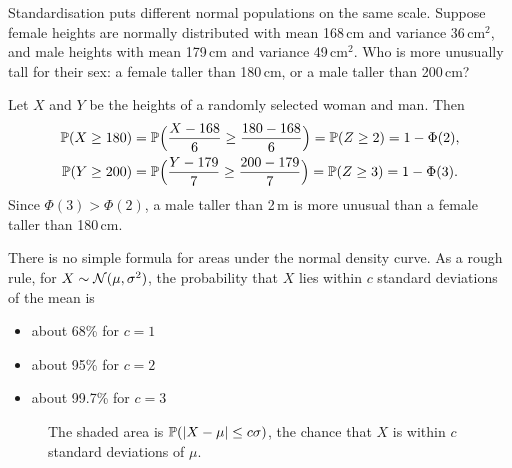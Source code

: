 \begin{example}\label{ex:standardisation-heights}
Standardisation puts different normal populations on the same scale. Suppose female heights are normally distributed with mean 168\,cm and variance 36\,cm$^2$, and male heights with mean 179\,cm and variance 49\,cm$^2$. Who is more unusually tall for their sex: a female taller than 180\,cm, or a male taller than 200\,cm?
\end{example}

\begin{solution}
Let $X$ and $Y$ be the heights of a randomly selected woman and man. Then
\begin{align*}
  \mathbb{P}(X \ge 180) &= \mathbb{P}\Bigl(\frac{X - 168}{6} \ge \frac{180 - 168}{6}\Bigr) = \mathbb{P}(Z \ge 2) = 1 - \Phi(2), \\
  \mathbb{P}(Y \ge 200) &= \mathbb{P}\Bigl(\frac{Y - 179}{7} \ge \frac{200 - 179}{7}\Bigr) = \mathbb{P}(Z \ge 3) = 1 - \Phi(3).
\end{align*}
Since $\Phi(3) > \Phi(2)$, a male taller than 2\,m is more unusual than a female taller than 180\,cm.
\end{solution}

There is no simple formula for areas under the normal density curve. As a rough rule, for $X \sim \mathcal{N}(\mu, \sigma^2)$, the probability that $X$ lies within $c$ standard deviations of the mean is
\begin{itemize}
  \item about 68\% for $c = 1$
  \item about 95\% for $c = 2$
  \item about 99.7\% for $c = 3$
\end{itemize}

\begin{figure}[H]
\centering
{}
\caption{The shaded area is $\mathbb{P}(\lvert X - \mu\rvert \le c\sigma)$, the chance that $X$ is within $c$ standard deviations of $\mu$.}
\label{fig:normal-within-c-sd}
\end{figure}


